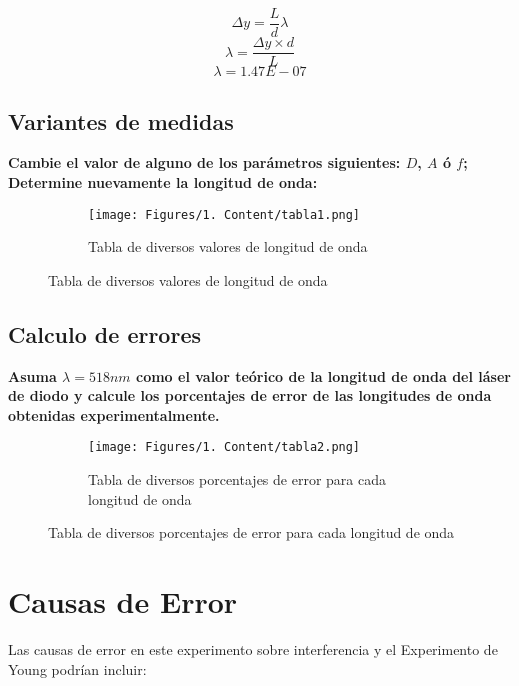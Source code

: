 \[ \Delta y = \frac{L}{d}\lambda \]
\[ \lambda = \frac{\Delta y\times d}{L} \]
\[ \lambda = 1.47E-07 \]

\subsection{Variantes de medidas}
\textbf{Cambie el valor de alguno de los parámetros siguientes: $D$, $A$ ó $f$; Determine nuevamente la longitud de onda:}

\begin{figure}[H]
  \centering
  \begin{subfigure}[b]{\textwidth}
      \centering
      \texttt{[image: Figures/1. Content/tabla1.png]}
      \caption{Tabla de diversos valores de longitud de onda}
      \label{fig: Diversos valores de longitud de onda}
  \end{subfigure}
  \hfill
\end{figure}

\subsection{Calculo de errores}
\textbf{Asuma $\lambda = 518nm$ como el valor teórico de la longitud de onda del láser de diodo
y calcule los porcentajes de error de las longitudes de onda obtenidas
experimentalmente.}

\begin{figure}[H]
  \centering
  \begin{subfigure}[b]{\textwidth}
      \centering
      \texttt{[image: Figures/1. Content/tabla2.png]}
      \caption{Tabla de diversos porcentajes de error para cada longitud de onda}
      \label{fig: Tabla de diversos porcentajes de error para cada longitud de onda}
  \end{subfigure}
  \hfill
\end{figure}


\section{Causas de Error}
Las causas de error en este experimento sobre interferencia y el Experimento de Young podrían incluir:

